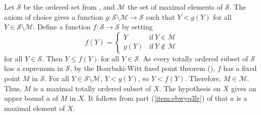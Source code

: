 \documentclass{article}
\begin{document}
\begin{solution}[\ref{exe:h4ww3mr2}]
  \label{sol:pgr3pn5c}
  Let \(\mathcal{S}\) be the ordered set from , and
  \(\mathcal{M}\) the set of maximal elements of \(\mathcal{S}\).  The
  axiom of choice gives a function
  \(g : \mathcal{S} \setminus \mathcal{M} \to \mathcal{S}\) such that
  \(Y < g(Y)\) for all \(Y \in \mathcal{S} \setminus \mathcal{M}\).
  Define a function \(f : \mathcal{S} \to \mathcal{S}\) by setting
  \begin{displaymath}
    f(Y) =
    \begin{cases}
      Y & \text{if} ~ Y \in \mathcal{M} \\
      g(Y) & \text{if} ~ Y \notin \mathcal{M}
    \end{cases}
  \end{displaymath}
  for all \(Y \in \mathcal{S}\).  Then \(Y \leq f(Y)\) for all
  \(Y \in \mathcal{S}\).  As every totally ordered subset of
  \(\mathcal{S}\) has a supremum in \(\mathcal{S}\), by the
  Bourbaki-Witt fixed point theorem (), \(f\) has a
  fixed point \(M\) in \(\mathcal{S}\).  For all
  \(Y \in \mathcal{S} \setminus \mathcal{M}\), \(Y < g(Y)\), so
  \(Y < f(Y)\).  Therefore, \(M \in \mathcal{M}\).  Thus, \(M\) is a
  maximal totally ordered subset of \(X\).  The hypothesis on \(X\)
  gives an upper bound \(a\) of \(M\) in \(X\).  It follows from part
  (\ref{item:ebwyq3lr}) of  that \(a\) is a maximal
  element of \(X\).
\end{solution}
\end{document}
